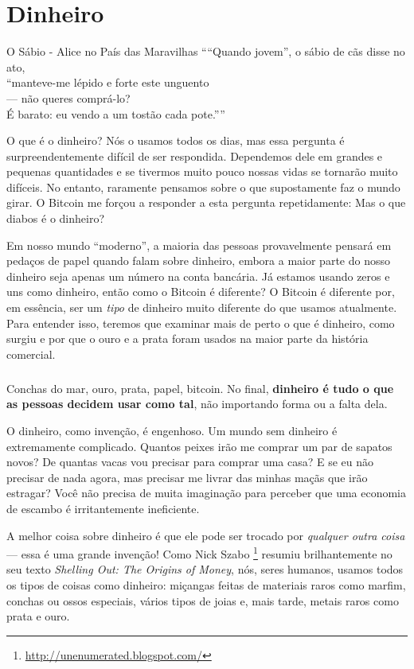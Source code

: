 \chapter{Dinheiro}
\label{les:11}

\begin{chapquote}{O Sábio - Alice no País das Maravilhas}
\enquote{“Quando jovem”, o sábio de cãs disse no ato,\\
“manteve-me lépido e forte este unguento\\
— não queres comprá-lo? \\
É barato: eu vendo a um tostão cada pote.”}
\end{chapquote}

O que é o dinheiro? Nós o usamos todos os dias, mas essa pergunta é surpreendentemente difícil de ser respondida. Dependemos dele em grandes e pequenas quantidades e se tivermos muito pouco nossas vidas se tornarão muito difíceis. No entanto, raramente pensamos sobre o que supostamente faz o mundo girar. O Bitcoin me forçou a responder a esta pergunta repetidamente: Mas o que diabos é o dinheiro?

Em nosso mundo \enquote{moderno}, a maioria das pessoas provavelmente pensará em pedaços de papel quando falam sobre dinheiro, embora a maior parte do nosso dinheiro seja apenas um número na conta bancária. Já estamos usando zeros e uns como dinheiro, então como o Bitcoin é diferente? O Bitcoin é diferente por, em essência, ser um \textit{tipo} de dinheiro muito diferente do que usamos atualmente. Para entender isso, teremos que examinar mais de perto o que é dinheiro, como surgiu e por que o ouro e a prata foram usados na maior parte da história comercial.

\paragraph{}
Conchas do mar, ouro, prata, papel, bitcoin. No final, \textbf{dinheiro é tudo o que as pessoas decidem usar como tal}, não importando forma ou a falta dela.

O dinheiro, como invenção, é engenhoso. Um mundo sem dinheiro é extremamente complicado. Quantos peixes irão me comprar um par de sapatos novos? De quantas vacas vou precisar para comprar uma casa? E se eu não precisar de nada agora, mas precisar me livrar das minhas maçãs que irão estragar? Você não precisa de muita imaginação para perceber que uma economia de escambo é irritantemente ineficiente.

A melhor coisa sobre dinheiro é que ele pode ser trocado por \textit{qualquer outra coisa} --- essa é uma grande invenção! Como Nick Szabo \footnote{\url{http://unenumerated.blogspot.com/}} resumiu brilhantemente no seu texto \textit{Shelling Out: The Origins of Money}\cite{shelling-out}, nós, seres humanos, usamos todos os tipos de coisas como dinheiro: miçangas feitas de materiais raros como marfim, conchas ou ossos especiais, vários tipos de joias e, mais tarde, metais raros como prata e ouro.

